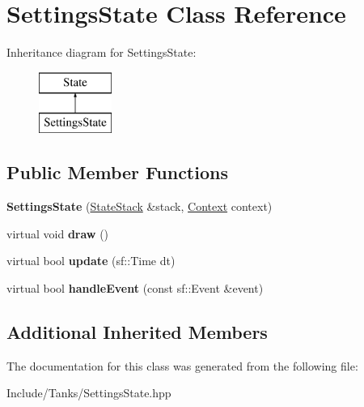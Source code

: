 \hypertarget{class_settings_state}{}\section{Settings\+State Class Reference}
\label{class_settings_state}
Inheritance diagram for Settings\+State\+:\begin{figure}[H]
\begin{center}
\leavevmode
\includegraphics[height=2.000000cm]{class_settings_state}
\end{center}
\end{figure}
\subsection*{Public Member Functions}
\begin{DoxyCompactItemize}
\item 
\hypertarget{class_settings_state_a949344118b93b89df8426ff84bac3d3b}{}{\bfseries Settings\+State} (\hyperlink{class_state_stack}{State\+Stack} \&stack, \hyperlink{struct_state_1_1_context}{Context} context)\label{class_settings_state_a949344118b93b89df8426ff84bac3d3b}

\item 
\hypertarget{class_settings_state_a4398844b0b4a5945159d1396759dc870}{}virtual void {\bfseries draw} ()\label{class_settings_state_a4398844b0b4a5945159d1396759dc870}

\item 
\hypertarget{class_settings_state_a2514872c685a2da59ca903aa82fa22a9}{}virtual bool {\bfseries update} (sf\+::\+Time dt)\label{class_settings_state_a2514872c685a2da59ca903aa82fa22a9}

\item 
\hypertarget{class_settings_state_a4cc7a66d730634afa6fcefff96f82268}{}virtual bool {\bfseries handle\+Event} (const sf\+::\+Event \&event)\label{class_settings_state_a4cc7a66d730634afa6fcefff96f82268}

\end{DoxyCompactItemize}
\subsection*{Additional Inherited Members}


The documentation for this class was generated from the following file\+:\begin{DoxyCompactItemize}
\item 
Include/\+Tanks/Settings\+State.\+hpp\end{DoxyCompactItemize}
